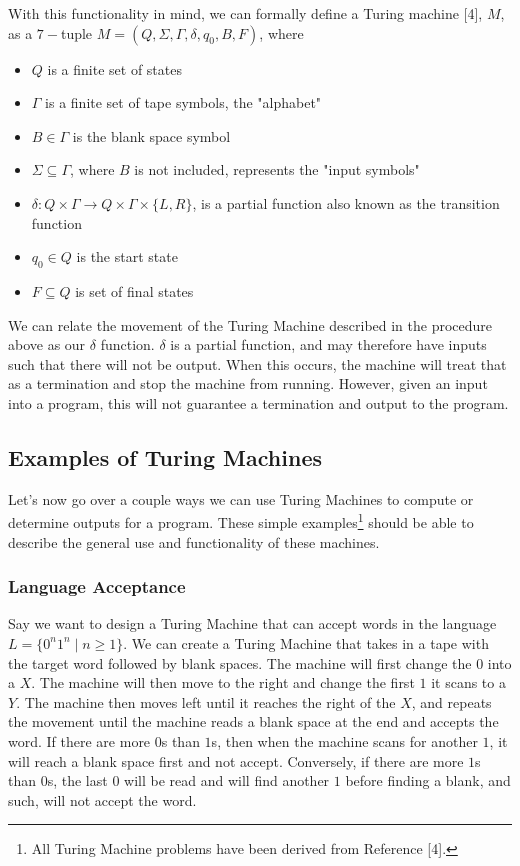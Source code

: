 \documentclass[11pt]{article}
\begin{document}
\noindent With this functionality in mind, we can formally define a Turing machine [4], $M$, as a $7-$tuple $M=(Q,\Sigma, \Gamma, \delta, q_0, B, F)$, where


\begin{itemize}

\item $Q$ is a finite set of states
\item $\Gamma$ is a finite set of tape symbols, the "alphabet"
\item $B \in \Gamma$ is the blank space symbol
\item $\Sigma \subseteq \Gamma$, where $B$ is not included, represents the "input symbols"
\item $\delta : Q \times \Gamma \to Q \times \Gamma \times \{L,R\}$, is a partial function also known as the transition function
\item $q_0 \in Q$ is the start state
\item $F \subseteq Q$ is set of final states

\end{itemize}

We can relate the movement of the Turing Machine described in the procedure above as our $\delta$ function. $\delta$ is a partial function, and may therefore have inputs such that there will not be output. When this occurs, the machine will treat that as a termination and stop the machine from running. However, given an input into a program, this will not guarantee a termination and output to the program.

\subsection{Examples of Turing Machines}

Let's now go over a couple ways we can use Turing Machines to compute or determine outputs for a program. These simple examples\footnote{All Turing Machine problems have been derived from Reference [4].} should be able to describe the general use and functionality of these machines.
\subsubsection*{Language Acceptance}

Say we want to design a Turing Machine that can accept words in the language $L = \{0^n1^n \mid n \geq 1 \}$. We can create a Turing Machine that takes in a tape with the target word followed by blank spaces. The machine will first change the $0$ into a $X$. The machine will then move to the right and change the first $1$ it scans to a $Y$. The machine then moves left until it reaches the right of the $X$, and repeats the movement until the machine reads a blank space at the end and accepts the word. If there are more $0$s than $1$s, then when the machine scans for another $1$, it will reach a blank space first and not accept. Conversely, if there are more $1$s than $0$s, the last $0$ will be read and will find another $1$ before finding a blank, and such, will not accept the word.
\end{document}
